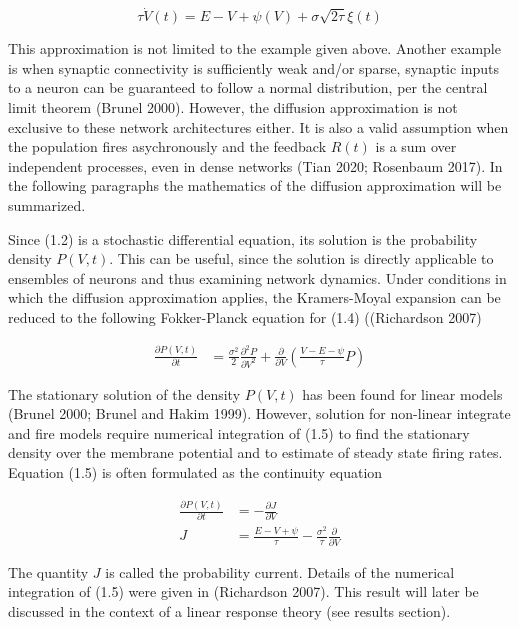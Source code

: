\documentclass{ucetd}
\begin{document}
\begin{equation}
\tau\dot{V}(t) = E - V + \psi(V) + \sigma\sqrt{2\tau}\xi(t)
\end{equation}

This approximation is not limited to the example given above. Another example is when synaptic connectivity is sufficiently weak and/or sparse, synaptic inputs to a neuron can be guaranteed to follow a normal distribution, per the central limit theorem (Brunel 2000). However, the diffusion approximation is not exclusive to these network architectures either. It is also a valid assumption when the population fires asychronously and the feedback $R(t)$ is a sum over independent processes, even in dense networks (Tian 2020; Rosenbaum 2017). In the following paragraphs the mathematics of the diffusion approximation will be summarized.

Since (1.2) is a stochastic differential equation, its solution is the probability density $P(V,t)$. This can be useful, since the solution is directly applicable to ensembles of neurons and thus examining network dynamics. Under conditions in which the diffusion approximation applies, the Kramers-Moyal expansion can be reduced to the following Fokker-Planck equation for (1.4) ((Richardson 2007)


\begin{align}
\frac{\partial P(V,t)}{\partial t} &= \frac{\sigma^{2}}{2}\frac{\partial^{2}P}{\partial V^{2}} + \frac{\partial}{\partial V}\left(\frac{V-E-\psi}{\tau}P\right)
\end{align}


The stationary solution of the density $P(V,t)$ has been found for linear models (Brunel 2000; Brunel and Hakim 1999). However, solution for non-linear integrate and fire models require numerical integration of (1.5) to find the stationary density over the membrane potential and to estimate of steady state firing rates. Equation (1.5) is often formulated as the continuity equation

\begin{align*}
\frac{\partial P(V,t)}{\partial t} &= -\frac{\partial J}{\partial V}\\
J &= \frac{E-V+\psi}{\tau} - \frac{\sigma^{2}}{\tau}\frac{\partial}{\partial V}
\end{align*}

The quantity $J$ is called the probability current. Details of the numerical integration of (1.5) were given in (Richardson 2007). This result will later be discussed in the context of a linear response theory (see results section). 
\end{document}
